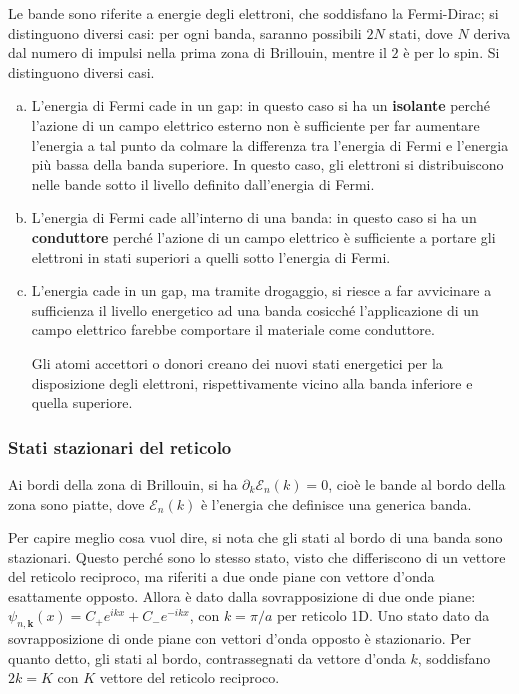 \documentclass[10pt, a4paper]{scrartcl}
\numberwithin{equation}{subsection}
\theoremstyle{style1}
\theoremstyle{style2}
\begin{document}
Le bande sono riferite a energie degli elettroni, che soddisfano la Fermi-Dirac; si distinguono diversi casi: per ogni banda, saranno possibili $2N$ stati, dove $N$ deriva dal numero di impulsi nella prima zona di Brillouin, mentre il $2$ \`e per lo spin. 
Si distinguono diversi casi.
\begin{enumerate}[(a).]
	\item L'energia di Fermi cade in un gap: in questo caso si ha un \textbf{isolante} perch\'e l'azione di un campo elettrico esterno non \`e sufficiente per far aumentare l'energia a tal punto da colmare la differenza tra l'energia di Fermi e l'energia pi\`u bassa della banda superiore. In questo caso, gli elettroni si distribuiscono nelle bande sotto il livello definito dall'energia di Fermi.
	\item L'energia di Fermi cade all'interno di una banda: in questo caso si ha un \textbf{conduttore} perch\'e l'azione di un campo elettrico \`e sufficiente a portare gli elettroni in stati superiori a quelli sotto l'energia di Fermi.
	\item L'energia cade in un gap, ma tramite drogaggio, si riesce a far avvicinare a sufficienza il livello energetico ad una banda cosicch\'e l'applicazione di un campo elettrico farebbe comportare il materiale come conduttore. 

		Gli atomi accettori o donori creano dei nuovi stati energetici per la disposizione degli elettroni, rispettivamente vicino alla banda inferiore e quella superiore.
\end{enumerate}
\subsubsection{Stati stazionari del reticolo}


Ai bordi della zona di Brillouin, si ha $\partial _k \mathscr{E}_n(k) = 0 $, cio\`e le bande al bordo della zona sono piatte, dove $\mathscr{E}_n (k)$ \`e l'energia che definisce una generica banda.

Per capire meglio cosa vuol dire, si nota che gli stati al bordo di una banda sono stazionari. 
Questo perch\'e sono lo stesso stato, visto che differiscono di un vettore del reticolo reciproco, ma riferiti a due onde piane con vettore d'onda esattamente opposto. 
Allora \`e dato dalla sovrapposizione di due onde piane: $\psi _{n,\mathbf{k} } (x) = C_+ e^{ikx} + C_- e^{-ikx} $, con $k= \pi/a$ per reticolo 1D. Uno stato dato da sovrapposizione di onde piane con vettori d'onda opposto \`e stazionario.
Per quanto detto, gli stati al bordo, contrassegnati da vettore d'onda $k$, soddisfano $2k = K$ con $K$ vettore del reticolo reciproco.
\end{document}
